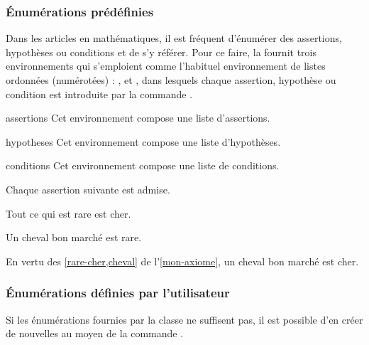 \documentclass[english,nolocaltoc]{nwejmart}
\newtheorem[style=definition]{fait}
\newtheorem[title=expérience]{experience}
\newtheorem[title-plural=anneaux]{anneau}
\newtheorem[title=idéal,title-plural=idéaux]{ideal}
\begin{document}
\subsubsection{Énumérations prédéfinies}
\label{sec:predefinies-:-listes}

Dans les articles en mathématiques, il est fréquent d'énumérer des assertions,
hypothèses ou conditions et de s'y référer. Pour ce faire, la \nwejmauthorcl{}
fournit trois environnements qui s'emploient comme l'habituel environnement
 de listes ordonnées (numérotées) :
,  et , dans lesquels
chaque assertion, hypothèse ou condition est introduite par la commande
.

\begin{docEnvironment}[doclang/environment content=assertions]{assertions}{}
  Cet environnement compose une liste d'assertions.
\end{docEnvironment}
\begin{docEnvironment}[doclang/environment content=hypothèses]{hypotheses}{}
  Cet environnement compose une liste d'hypothèses.
\end{docEnvironment}
\begin{docEnvironment}[doc new=2019-03-18,doclang/environment content=conditions]{conditions}{}
  Cet environnement compose une liste de conditions.
\end{docEnvironment}

\begin{bodycode}[listing and text,listing options={deletekeywords={[2]label}}]
\begin{axiom}\label{mon-axiome}
  Chaque assertion suivante est admise.
  \begin{assertions}
  \item\label{rare-cher} Tout ce qui est rare est cher.
  \item\label{cheval} Un cheval bon marché est rare.
  \end{assertions}
\end{axiom}
En vertu des \vref{rare-cher,cheval} de l'\vref{mon-axiome},
un cheval bon marché est cher.
\end{bodycode}

\subsubsection{Énumérations définies par l'utilisateur}

Si les énumérations fournies par la classe ne suffisent pas, il est possible
d'en créer de nouvelles au moyen de la commande .
\end{document}
